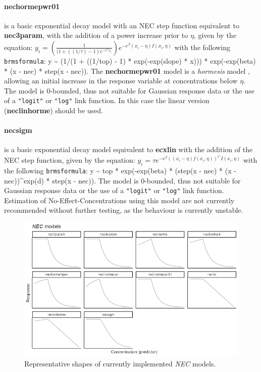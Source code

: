 \documentclass[
  shortnames]{jss}
\begin{document}
\hypertarget{nechormepwr01}{%
\paragraph{nechormepwr01}\label{nechormepwr01}}

is a basic exponential decay model with an NEC step function equivalent to \textbf{nec3param}, with the addition of a power increase prior to \(\eta\), given by the equation:
\(y_i = \left(\frac{1}{(1 + ((1/\tau)-1) e^{-e^{\alpha}x_i}}\right) e^{-e^{\beta} \left(x_i - \eta \right) I(x_i, \eta)}\)
with the following \texttt{brmsformula}: y \textasciitilde{} (1/(1 + ((1/top) - 1) * exp(-exp(slope) * x))) * exp(-exp(beta) * (x - nec) * step(x - nec)). The \textbf{nechormepwr01} model is a \emph{hormesis} model \citep{Mattson2008}, allowing an initial increase in the response variable at concentrations below \(\eta\). The model is 0-bounded, thus not suitable for Gaussian response data or the use of a \texttt{"logit"} or \texttt{"log"} link function. In this case the linear version (\textbf{neclinhorme}) should be used.

\hypertarget{necsigm}{%
\paragraph{necsigm}\label{necsigm}}

is a basic exponential decay model equivalent to \textbf{ecxlin} with the addition of the NEC step function, given by the equation:
\(y_i = \tau e^{-e^{\beta} ((x_i - \eta) f(x_i, \eta))^{e^\epsilon}I(x_i, \eta)}\)
with the following \texttt{brmsformula}: y \textasciitilde{} top * exp(-exp(beta) * (step(x - nec) * (x - nec))\^{}exp(d) * step(x - nec)). The model is 0-bounded, thus not suitable for Gaussian response data or the use of a \texttt{"logit"} or \texttt{"log"} link function. Estimation of No-Effect-Concentrations using this model are not currently recommended without further testing, as the behaviour is currently unstable.

\begin{figure}[ht]
  \centering
  \includegraphics[width=1\textwidth]{../vignettes/vignette-fig-exmp2b-theoretical_nec_curves.png}
  \caption{Representative shapes of currently implemented  \textit{NEC} models.}
  \label{fig2}
\end{figure}
\end{document}
